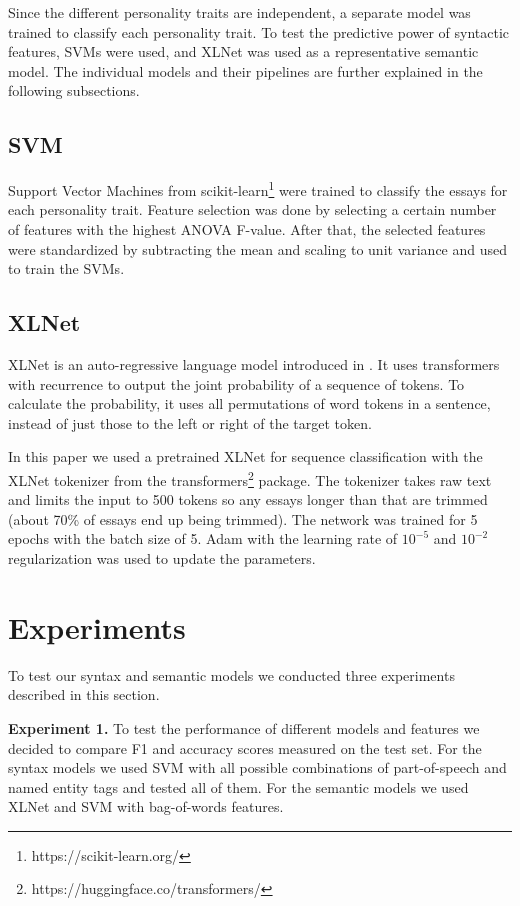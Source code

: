 \documentclass[10pt, a4paper]{article}
\begin{document}
Since the different personality traits are independent, a separate model was trained to classify each personality trait.
To test the predictive power of syntactic features, SVMs were used, and XLNet was used as a representative semantic model.
The individual models and their pipelines are further explained in the following subsections.

\subsection{SVM}

Support Vector Machines from scikit-learn\footnote{https://scikit-learn.org/} were trained to classify the essays for each personality trait.
Feature selection was done by selecting a certain number of features with the highest ANOVA F-value.
After that, the selected features were standardized by subtracting the mean and scaling to unit variance and used to train the SVMs.

\subsection{XLNet}

XLNet is an auto-regressive language model introduced in \citep{DBLP:journals/corr/abs-1906-08237}.
It uses transformers with recurrence to output the joint probability of a sequence of tokens.
To calculate the probability, it uses all permutations of word tokens in a sentence, instead of just those to the left or right of the target token.

In this paper we used a pretrained XLNet for sequence classification with the XLNet tokenizer from the transformers\footnote{https://huggingface.co/transformers/} package.
The tokenizer takes raw text and limits the input to 500 tokens so any essays longer than that are trimmed (about 70\% of essays end up being trimmed).
The network was trained for 5 epochs with the batch size of 5.
Adam with the learning rate of $10^{-5}$ and $10^{-2}$ regularization was used to update the parameters.

\section{Experiments}
To test our syntax and semantic models we conducted three experiments described in this section.

\textbf{Experiment 1.} To test the performance of different models and features we decided to compare F1 and accuracy scores measured on the test set.
For the syntax models we used SVM with all possible combinations of part-of-speech and named entity tags and tested all of them.
For the semantic models we used XLNet and SVM with bag-of-words features.
\end{document}
